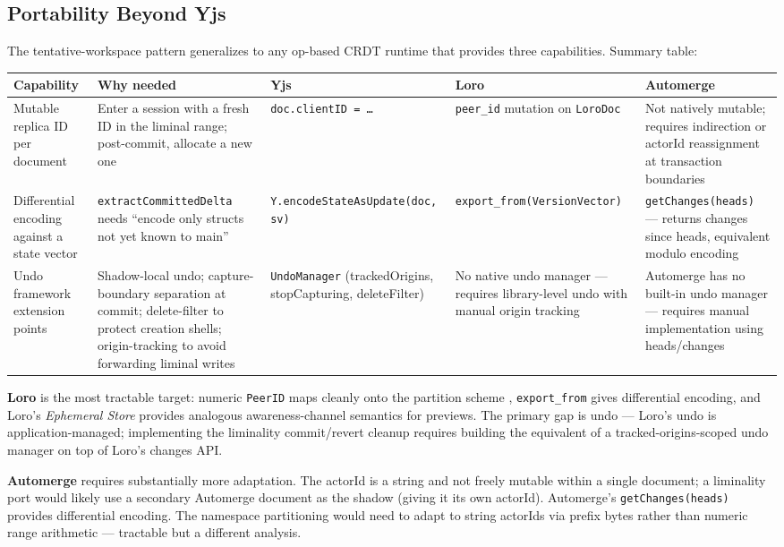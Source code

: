 \subsection{Portability Beyond Yjs}

The tentative-workspace pattern generalizes to any op-based CRDT runtime that provides three capabilities. Summary table:

\begin{table}[t]
\centering
\scriptsize
\begin{tabularx}{\textwidth}{@{}p{}XXXX@{}}
\toprule
\textbf{Capability} & \textbf{Why needed} & \textbf{Yjs} & \textbf{Loro} & \textbf{Automerge} \\
\midrule
Mutable replica ID per document & Enter a session with a fresh ID in the liminal range; post-commit, allocate a new one & \texttt{doc.clientID = \ldots} & \texttt{peer\_id} mutation on \texttt{LoroDoc} & Not natively mutable; requires indirection or actorId reassignment at transaction boundaries \\
Differential encoding against a state vector & \texttt{extractCommittedDelta} needs ``encode only structs not yet known to main'' & \texttt{Y.encodeStateAsUpdate(doc, sv)} & \texttt{export\_from(VersionVector)} & \texttt{getChanges(heads)} --- returns changes since heads, equivalent modulo encoding \\
Undo framework extension points & Shadow-local undo; capture-boundary separation at commit; delete-filter to protect creation shells; origin-tracking to avoid forwarding liminal writes & \texttt{UndoManager} (trackedOrigins, stopCapturing, deleteFilter) & No native undo manager --- requires library-level undo with manual origin tracking & Automerge has no built-in undo manager --- requires manual implementation using heads/changes \\
\bottomrule
\end{tabularx}
\end{table}

\textbf{Loro} is the most tractable target: numeric \texttt{PeerID} maps cleanly onto the partition scheme \cite{plexus:partitioning}, \texttt{export\_from} gives differential encoding, and Loro's \emph{Ephemeral Store} provides analogous awareness-channel semantics for previews. The primary gap is undo --- Loro's undo is application-managed; implementing the liminality commit/revert cleanup requires building the equivalent of a tracked-origins-scoped undo manager on top of Loro's changes API.

\textbf{Automerge} requires substantially more adaptation. The actorId is a string and not freely mutable within a single document; a liminality port would likely use a secondary Automerge document as the shadow (giving it its own actorId). Automerge's \texttt{getChanges(heads)} provides differential encoding. The namespace partitioning \cite{plexus:partitioning} would need to adapt to string actorIds via prefix bytes rather than numeric range arithmetic --- tractable but a different analysis.

